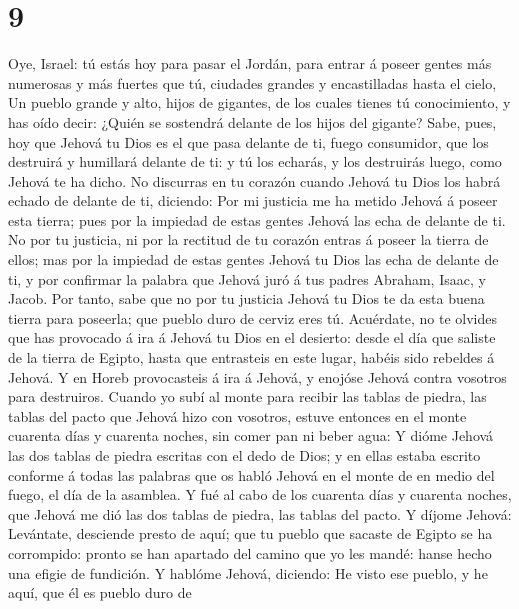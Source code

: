 \hypertarget{section-8}{%
\section{9}\label{section-8}}

 Oye, Israel: tú estás hoy para pasar el Jordán, para entrar
á poseer gentes más numerosas y más fuertes que tú, ciudades grandes y
encastilladas hasta el cielo,  Un pueblo grande y alto,
hijos de gigantes, de los cuales tienes tú conocimiento, y has oído
decir: ¿Quién se sostendrá delante de los hijos del gigante?
 Sabe, pues, hoy que Jehová tu Dios es el que pasa delante
de ti, fuego consumidor, que los destruirá y humillará delante de ti: y
tú los echarás, y los destruirás luego, como Jehová te ha dicho.
 No discurras en tu corazón cuando Jehová tu Dios los habrá
echado de delante de ti, diciendo: Por mi justicia me ha metido Jehová á
poseer esta tierra; pues por la impiedad de estas gentes Jehová las echa
de delante de ti.  No por tu justicia, ni por la rectitud de
tu corazón entras á poseer la tierra de ellos; mas por la impiedad de
estas gentes Jehová tu Dios las echa de delante de ti, y por confirmar
la palabra que Jehová juró á tus padres Abraham, Isaac, y Jacob.
 Por tanto, sabe que no por tu justicia Jehová tu Dios te da
esta buena tierra para poseerla; que pueblo duro de cerviz eres tú.
 Acuérdate, no te olvides que has provocado á ira á Jehová
tu Dios en el desierto: desde el día que saliste de la tierra de Egipto,
hasta que entrasteis en este lugar, habéis sido rebeldes á Jehová.
 Y en Horeb provocasteis á ira á Jehová, y enojóse Jehová
contra vosotros para destruiros.  Cuando yo subí al monte
para recibir las tablas de piedra, las tablas del pacto que Jehová hizo
con vosotros, estuve entonces en el monte cuarenta días y cuarenta
noches, sin comer pan ni beber agua:  Y dióme Jehová las
dos tablas de piedra escritas con el dedo de Dios; y en ellas estaba
escrito conforme á todas las palabras que os habló Jehová en el monte de
en medio del fuego, el día de la asamblea.  Y fué al cabo
de los cuarenta días y cuarenta noches, que Jehová me dió las dos tablas
de piedra, las tablas del pacto.  Y díjome Jehová:
Levántate, desciende presto de aquí; que tu pueblo que sacaste de Egipto
se ha corrompido: pronto se han apartado del camino que yo les mandé:
hanse hecho una efigie de fundición.  Y hablóme Jehová,
diciendo: He visto ese pueblo, y he aquí, que él es pueblo duro de
